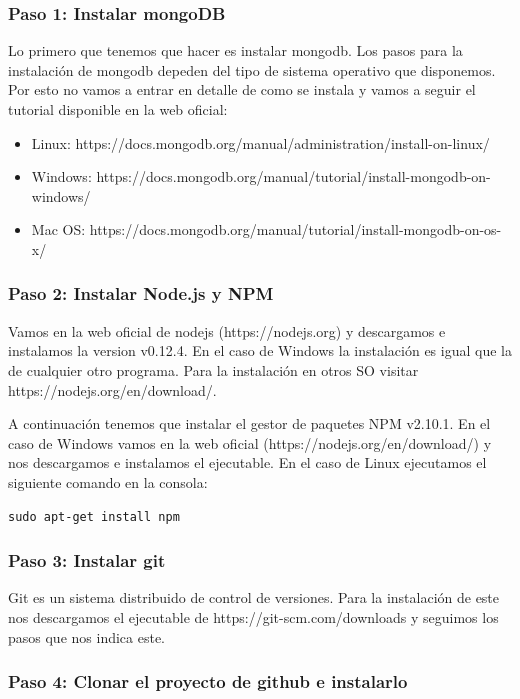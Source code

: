 \subsubsection{Paso 1: Instalar mongoDB}

Lo primero que tenemos que hacer es instalar mongodb. Los pasos para la instalación de mongodb depeden del tipo de sistema operativo que disponemos. Por esto no vamos a entrar en detalle de como se instala y vamos a seguir el tutorial disponible en la web oficial:

\begin{itemize}
	\item Linux: https://docs.mongodb.org/manual/administration/install-on-linux/
	\item Windows: https://docs.mongodb.org/manual/tutorial/install-mongodb-on-windows/
	\item Mac OS: https://docs.mongodb.org/manual/tutorial/install-mongodb-on-os-x/
\end{itemize}

\subsubsection{Paso 2: Instalar Node.js y NPM}

Vamos en la web oficial de nodejs (https://nodejs.org) y descargamos e instalamos la version v0.12.4. En el caso de Windows la instalación es igual que la de cualquier otro programa. Para la instalación en otros SO visitar https://nodejs.org/en/download/.

A continuación tenemos que instalar el gestor de paquetes NPM v2.10.1. En el caso de Windows vamos en la web oficial (https://nodejs.org/en/download/) y nos descargamos e instalamos el ejecutable. En el caso de Linux ejecutamos el siguiente comando en la consola:
\begin{lstlisting}[language=xml, frame=single]
sudo apt-get install npm
\end{lstlisting}

\subsubsection{Paso 3: Instalar git}

Git es un sistema distribuido de control de versiones. Para la instalación de este nos descargamos el ejecutable de https://git-scm.com/downloads y seguimos los pasos que nos indica este.

\subsubsection{Paso 4: Clonar el proyecto de github e instalarlo}

